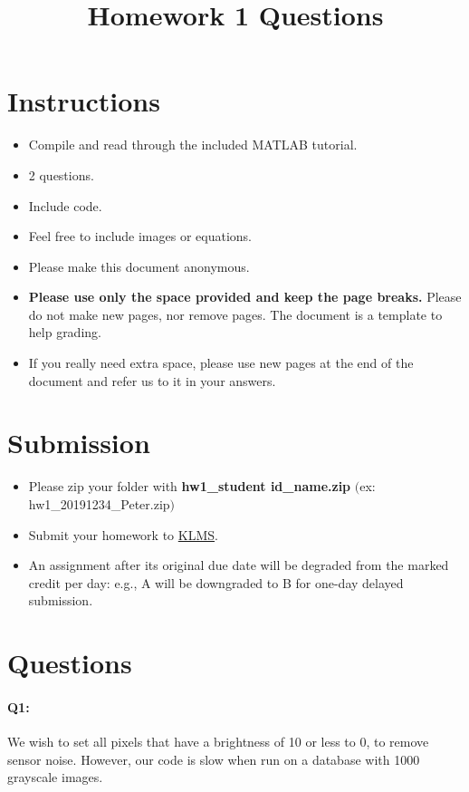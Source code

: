 \documentclass[11pt]{article}
\date{}
\title{\vspace{-1cm}Homework 1 Questions}
\begin{document}
\maketitle
\vspace{-2cm}
\thispagestyle{fancy}

\section*{Instructions}
\begin{itemize}
  \item Compile and read through the included MATLAB tutorial.
  \item 2 questions.
  \item Include code.
  \item Feel free to include images or equations.
  \item Please make this document anonymous.
  \item \textbf{Please use only the space provided and keep the page breaks.} Please do not make new pages, nor remove pages. The document is a template to help grading.
  \item If you really need extra space, please use new pages at the end of the document and refer us to it in your answers.
\end{itemize}


\section*{Submission}
\begin{itemize}
  \item Please zip your folder with \textbf{hw1\_student id\_name.zip} $($ex: hw1\_20191234\_Peter.zip$)$
  \item Submit your homework to \href{http://klms.kaist.ac.kr/course/view.php?id=109597}{KLMS}.
  \item An assignment after its original due date will be degraded from the marked credit per day: e.g., A will be downgraded to B for one-day delayed submission.
\end{itemize}

\pagebreak


\section*{Questions}



\paragraph{Q1:} We wish to set all pixels that have a brightness of 10 or less to 0, to remove sensor noise. However, our code is slow when run on a database with 1000 grayscale images.
\end{document}
